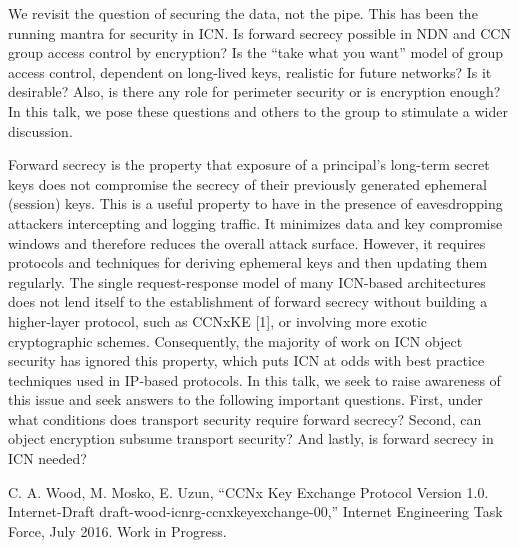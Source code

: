 \documentclass[a4paper,UKenglish]{dagrep}
\begin{document}
\license

We revisit the question of securing the data, not the pipe. This has been the running mantra for security in ICN. Is forward secrecy possible in NDN and CCN group access control by encryption? Is the ``take what you want'' model of group access control, dependent on long-lived keys, realistic for future networks? Is it desirable? Also, is there any role for perimeter security or is encryption enough? In this talk, we pose these questions and others to the group to stimulate a wider discussion.

\license

Forward secrecy is the property that exposure of a principal's long-term secret keys does not compromise the secrecy of their previously generated ephemeral (session) keys. This is a useful property to have in the presence of eavesdropping attackers intercepting and logging traffic. It minimizes data and key compromise windows and therefore reduces the overall attack surface. However, it requires protocols and techniques for deriving ephemeral keys and then updating them regularly. The single request-response model of many ICN-based architectures does not lend itself to the establishment of forward secrecy without building a higher-layer protocol, such as CCNxKE [1], or involving more exotic cryptographic schemes. Consequently, the majority of work on ICN object security has ignored this property, which puts ICN at odds with best practice techniques used in IP-based protocols. In this talk, we seek to raise awareness of this issue and seek answers to the following important questions. First, under what conditions does transport security require forward secrecy? Second, can object encryption subsume transport security? And lastly, is forward secrecy in ICN needed?

\begin{thebibliography}{0}
\bibitem{[1]} C. A. Wood, M. Mosko, E. Uzun, ``CCNx Key Exchange Protocol Version 1.0. Internet-Draft draft-wood-icnrg-ccnxkeyexchange-00,'' Internet Engineering Task Force, July 2016. Work in Progress.
\end{thebibliography}

\license
\end{document}
